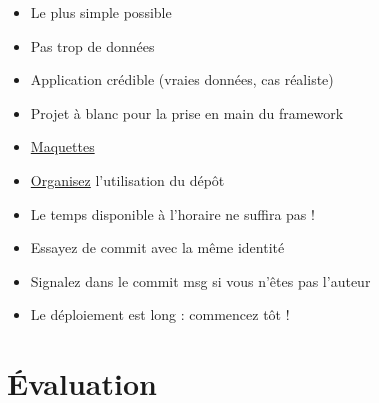 \begin{itemize}
\tightlist
\item
  Le plus simple possible
\item
  Pas trop de données
\item
  Application crédible (vraies données, cas réaliste)
\item
  Projet à blanc pour la prise en main du framework
\item
  \href{https://brainhub.eu/blog/difference-between-wireframe-mockup-prototype/}{Maquettes}
\item
  \href{http://drewfradette.ca/a-simpler-successful-git-branching-model/}{Organisez}
  l'utilisation du dépôt
\item
  Le temps disponible à l'horaire ne suffira pas !
\item
  Essayez de commit avec la même identité
\item
  Signalez dans le commit msg si vous n'êtes pas l'auteur
\item
  Le déploiement est long : commencez tôt !
\end{itemize}

\hypertarget{uxe9valuation}{%
\section{Évaluation}\label{uxe9valuation}}


